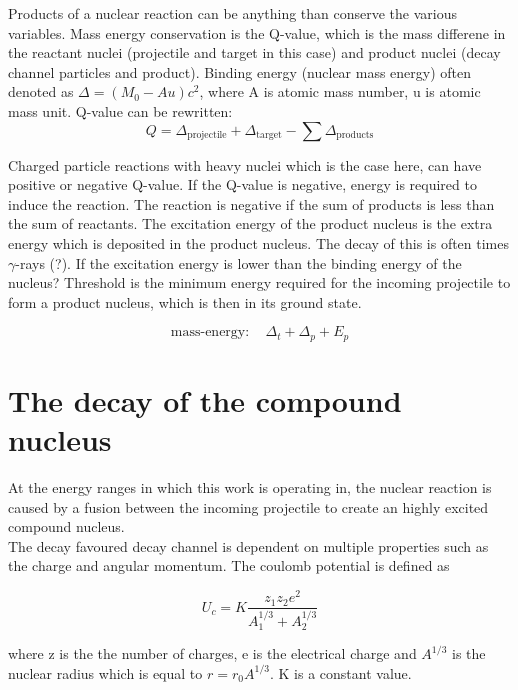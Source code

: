 \documentclass[a4paper,11pt,twoside]{book}
\begin{document}
Products of a nuclear reaction can be anything than conserve the various variables. Mass energy conservation is the Q-value, which is the mass differene in the reactant nuclei (projectile and target in this case) and product nuclei (decay channel particles and product). Binding energy (nuclear mass energy) often denoted as $\Delta=(M_0 - Au)c^2$, where A is atomic mass number, u is atomic mass unit. Q-value can be rewritten: 
\begin{equation}
    Q = \Delta_\text{projectile} + \Delta_\text{target} - \sum \Delta_\text{products}
\end{equation}

Charged particle reactions with heavy nuclei which is the case here, can have positive or negative Q-value. If the Q-value is negative, energy is required to induce the reaction. The reaction is negative if the sum of products is less than the sum of reactants. The excitation energy of the product nucleus is the extra energy which is deposited in the product nucleus. The decay of this is often times $\gamma$-rays (?). If the excitation energy is lower than the binding energy of the nucleus?  Threshold is the minimum energy required for the incoming projectile to form a product nucleus, which is then in its ground state. 

\begin{equation}
    \text{mass-energy}: \quad \Delta_t+ \Delta_p + E_p 
\end{equation}




\section{The decay of the compound nucleus}
At the energy ranges in which this work is operating in, the nuclear reaction is caused by a fusion between the incoming projectile to create an highly excited compound nucleus. \\ 

\noindent 
The decay favoured decay channel is dependent on multiple properties such as the charge and angular momentum. The coulomb potential is defined as 

\begin{equation}
    U_{c} = K\frac{z_1 z_ 2 e^2}{A_1^{1/3} + A_2^{1/3}}
\end{equation}

where z is the the number of charges, e is the electrical charge and $A^{1/3}$ is the nuclear radius which is equal to $r=r_0 A^{1/3}$. K is a constant value. 
\end{document}
